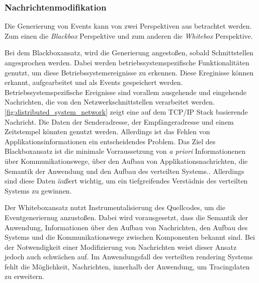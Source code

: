 \subsubsection{Nachrichtenmodifikation}

Die Generierung von Events kann von zwei Perspektiven aus betrachtet werden.
Zum einen die \emph{Blackbox} Perspektive und zum anderen die \emph{Whitebox} Perspektive.

Bei dem Blackboxansatz, wird die Generierung angestoßen, sobald Schnittstellen angesprochen werden. Dabei werden betriebssystemspezifische Funktionalitäten genutzt, um diese Betriebssystemereignisse zu erkennen. Diese Ereginisse können erkannt, aufgearbeitet und als Events gespeichert werden. Betriebssystemspezifische Ereignisse sind vorallem ausgehende und eingehende Nachrichten, die von den Netzwerkschnittstellen verarbeitet werden. \cref{fig:distributed_system_network} zeigt eine auf dem TCP/IP Stack basierende Nachricht. Die Daten der Senderadresse, der Empfängeradresse und einem Zeitstempel könnten genutzt werden. Allerdings ist das Fehlen von Applikationsinformationen ein entscheidendes Problem. Das Ziel des Blackboxansatz ist die minimale Vorraussetzung von \emph{a priori} Informationenen über Kommunikationswege, über den Aufbau von Applikationsnachrichten, die Semantik der Anwendung und den Aufbau des verteilten Systems.. Allerdings sind diese Daten äußert wichtig, um ein tiefgreifendes Verstädnis des verteilten Systems zu gewinnen. 

Der Whiteboxansatz nutzt Instrumentalisierung des Quellcodes, um die Eventgeneriernug anzustoßen. Dabei wird vorausgesetzt, dass die Semantik der Anwendung, Informationen über den Aufbau von Nachrichten, den Aufbau des Systems und die Kommunikationswege zwischen Komponenten bekannt sind. Bei der Notwendigkeit einer Modifizierung von Nachrichten weist dieser Ansatz jedoch auch schwächen auf. Im Anwendungsfall des verteilten rendering Systems fehlt die Möglichkeit, Nachrichten, innerhalb der Anwendung, um Tracingdaten zu erweitern.


